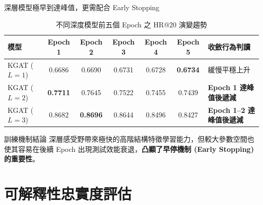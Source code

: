\documentclass[aspectratio=169, 10pt]{beamer}
\begin{document}
\begin{frame}{深層模型極早到達峰值，更需配合 Early Stopping}
  \begin{table}
    \centering
    \caption{不同深度模型前五個 Epoch 之 HR@20 演變趨勢}
    \begin{tabular}{l c c c c c l}
      \toprule
      \textbf{模型} & \textbf{Epoch 1} & \textbf{Epoch 2} & \textbf{Epoch 3} & \textbf{Epoch 4} & \textbf{Epoch 5} & \textbf{收斂行為判讀} \\
      \midrule
      KGAT ($L=1$) & 0.6686 & 0.6690 & 0.6731 & 0.6728 & \textbf{0.6734} & 緩慢平穩上升 \\
      KGAT ($L=2$) & \textbf{0.7711} & 0.7645 & 0.7522 & 0.7455 & 0.7439 & \textcolor{HighlightRed}{\textbf{Epoch 1 達峰值後遞減}} \\
      KGAT ($L=3$) & 0.8682 & \textbf{0.8696} & 0.8644 & 0.8496 & 0.8427 & \textcolor{HighlightRed}{\textbf{Epoch 1--2 達峰值後遞減}} \\
      \bottomrule
    \end{tabular}
  \end{table}
  
  \begin{block}{訓練機制結論}
    深層感受野帶來極快的高階結構特徵學習能力，但較大參數空間也使其容易在後續 Epoch 出現測試效能衰退，\textbf{凸顯了早停機制 (Early Stopping) 的重要性}。
  \end{block}
\end{frame}

\section{可解釋性忠實度評估}
\end{document}
